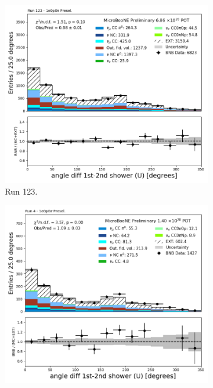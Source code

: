 \begin{figure}[H]
    \centering
    \begin{subfigure}[t]{0.32\linewidth}
        \includegraphics[width=\linewidth]{technote/Appendix_Preselection/Figures/1e0p0pi/Run123/anglediff_U_Run123_1e0p0pi_Presel.png}
        \caption{Run 123.}
    \end{subfigure}%
    \hspace{0.2cm}%
    \begin{subfigure}[t]{0.32\linewidth}
        \includegraphics[width=\linewidth]{technote/Appendix_Preselection/Figures/1e0p0pi/Run4b/anglediff_U_Run4b_1e0p0pi_Presel.png}

\end{subfigure}
\end{figure}
